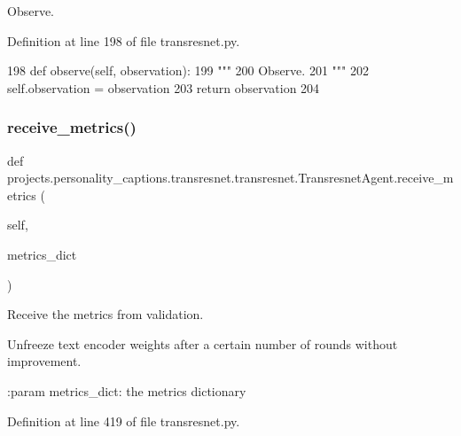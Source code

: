 \begin{DoxyVerb}Observe.
\end{DoxyVerb}
 

Definition at line 198 of file transresnet.\+py.


\begin{DoxyCode}
198     \textcolor{keyword}{def }observe(self, observation):
199         \textcolor{stringliteral}{"""}
200 \textcolor{stringliteral}{        Observe.}
201 \textcolor{stringliteral}{        """}
202         self.observation = observation
203         \textcolor{keywordflow}{return} observation
204 
\end{DoxyCode}
\mbox{\label{classprojects_1_1personality__captions_1_1transresnet_1_1transresnet_1_1TransresnetAgent_a969be7eaa4f82bb64b449b9750ddb383}} 
\subsubsection{\texorpdfstring{receive\+\_\+metrics()}{receive\_metrics()}}
{\footnotesize\ttfamily def projects.\+personality\+\_\+captions.\+transresnet.\+transresnet.\+Transresnet\+Agent.\+receive\+\_\+metrics (\begin{DoxyParamCaption}\item[{}]{self,  }\item[{}]{metrics\+\_\+dict }\end{DoxyParamCaption})}

\begin{DoxyVerb}Receive the metrics from validation.

Unfreeze text encoder weights after a certain number of rounds without improvement.

:param metrics_dict:
    the metrics dictionary
\end{DoxyVerb}
 

Definition at line 419 of file transresnet.\+py.



